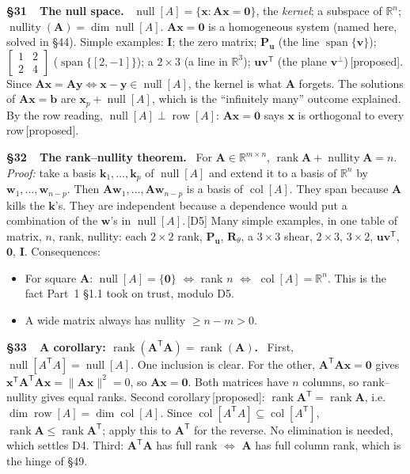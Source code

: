 \documentclass[11pt]{article}
\newcommand{\R}{\mathbb{R}}
\newcommand{\vc}[1]{\mathbf{#1}}
\newcommand{\mt}[1]{\mathbf{#1}}
\newcommand{\T}{^{\mathsf{T}}}
\newcommand{\norm}[1]{\lVert #1\rVert}
\newcommand{\colsp}[1]{\operatorname{col}[#1]}
\newcommand{\rowsp}[1]{\operatorname{row}[#1]}
\newcommand{\nullsp}[1]{\operatorname{null}[#1]}
\DeclareMathOperator{\rank}{rank}
\DeclareMathOperator{\nullity}{nullity}
\DeclareMathOperator{\spanop}{span}
\newcommand{\prop}{\,{\color{ForestGreen}\sffamily\scriptsize[proposed]}}
\newcommand{\see}[1]{\,{\color{BrickRed}\sffamily\scriptsize[#1]}}
\newcommand{\sect}[2]{\par\smallskip\noindent\textbf{\S#1\ \ #2.}\ \ignorespaces}
\begin{document}
\sect{31}{The null space} $\nullsp{A}=\{\vc{x}:\mt{A}\vc{x}=\vc{0}\}$, the
\emph{kernel}; a subspace of $\R^{n}$; $\nullity(\mt{A})=\dim\nullsp{A}$.
$\mt{A}\vc{x}=\vc{0}$ is a homogeneous system (named here, solved in \S44).
Simple examples: $\mt{I}$; the zero matrix; $\mt{P}_{\vc{u}}$ (the line
$\spanop\{\vc{v}\}$); $\begin{bmatrix}1&2\\2&4\end{bmatrix}$
($\spanop\{[2,-1]\}$); a $2\times3$ (a line in $\R^{3}$); $\vc{u}\vc{v}\T$ (the
plane $\vc{v}^{\perp}$)\prop. Since
$\mt{A}\vc{x}=\mt{A}\vc{y}\iff\vc{x}-\vc{y}\in\nullsp{A}$, the kernel is what
$\mt{A}$ forgets. The solutions of $\mt{A}\vc{x}=\vc{b}$ are
$\vc{x}_p+\nullsp{A}$, which is the ``infinitely many'' outcome explained.
By the row reading, $\nullsp{A}\perp\rowsp{A}$: $\mt{A}\vc{x}=\vc{0}$ says
$\vc{x}$ is orthogonal to every row\prop.

\sect{32}{The rank--nullity theorem} For $\mt{A}\in\R^{m\times n}$,
$\rank\mt{A}+\nullity\mt{A}=n$. \emph{Proof:} take a basis
$\vc{k}_1,\dots,\vc{k}_p$ of $\nullsp{A}$ and extend it to a basis of $\R^{n}$
by $\vc{w}_1,\dots,\vc{w}_{n-p}$. Then $\mt{A}\vc{w}_1,\dots,\mt{A}\vc{w}_{n-p}$
is a basis of $\colsp{A}$. They span because $\mt{A}$ kills the $\vc{k}$'s. They
are independent because a dependence would put a combination of the $\vc{w}$'s in
$\nullsp{A}$.\see{D5} Many simple examples, in one table of matrix, $n$, rank,
nullity: each $2\times2$ rank, $\mt{P}_{\vc{u}}$, $\mt{R}_\theta$, a
$3\times3$ shear, $2\times3$, $3\times2$, $\vc{u}\vc{v}\T$, $\mt{0}$,
$\mt{I}$. Consequences:
\begin{itemize}[leftmargin=1.4em]
  \item For square $\mt{A}$: $\nullsp{A}=\{\vc{0}\}$ $\iff$ rank $n$ $\iff$
        $\colsp{A}=\R^{n}$. This is the fact Part~1 \S1.1 took on trust,
        modulo D5.
  \item A wide matrix always has nullity $\ge n-m>0$.
\end{itemize}

\sect{33}{A corollary: $\rank(\mt{A}\T\mt{A})=\rank(\mt{A})$} First,
$\nullsp{A^{\mathsf T}A}=\nullsp{A}$. One inclusion is clear. For the other,
$\mt{A}\T\mt{A}\vc{x}=\vc{0}$ gives
$\vc{x}\T\mt{A}\T\mt{A}\vc{x}=\norm{\mt{A}\vc{x}}^{2}=0$, so
$\mt{A}\vc{x}=\vc{0}$. Both matrices have $n$ columns, so rank--nullity gives
equal ranks. Second corollary\prop: $\rank\mt{A}\T=\rank\mt{A}$, i.e.\
$\dim\rowsp{A}=\dim\colsp{A}$. Since $\colsp{A^{\mathsf T}A}\subseteq\colsp{A\T}$,
$\rank\mt{A}\le\rank\mt{A}\T$; apply this to $\mt{A}\T$ for the reverse. No
elimination is needed, which settles D4. Third: $\mt{A}\T\mt{A}$ has full rank
$\iff$ $\mt{A}$ has full column rank, which is the hinge of \S49.
\end{document}
